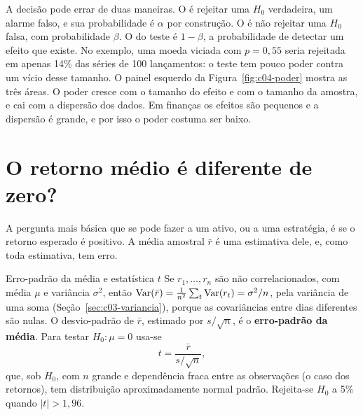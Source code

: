 A decisão pode errar de duas maneiras. O  é rejeitar uma $H_0$ verdadeira, um alarme falso, e sua probabilidade é $\alpha$ por construção. O  é não rejeitar uma $H_0$ falsa, com probabilidade $\beta$. O  do teste é $1 - \beta$, a probabilidade de detectar um efeito que existe. No exemplo, uma moeda viciada com $p = 0,55$ seria rejeitada em apenas 14\% das séries de 100 lançamentos: o teste tem pouco poder contra um vício desse tamanho. O painel esquerdo da Figura~\ref{fig:c04-poder} mostra as três áreas. O poder cresce com o tamanho do efeito e com o tamanho da amostra, e cai com a dispersão dos dados. Em finanças os efeitos são pequenos e a dispersão é grande, e por isso o poder costuma ser baixo.


\section{O retorno médio é diferente de zero?}
\label{sec:c04-media}

A pergunta mais básica que se pode fazer a um ativo, ou a uma estratégia, é se o retorno esperado é positivo. A média amostral $\bar r$ é uma estimativa dele, e, como toda estimativa, tem erro.

\begin{resultado}{Erro-padrão da média e estatística $t$}
Se $r_1, \dots, r_n$ são não correlacionados, com média $\mu$ e variância $\sigma^2$, então $\operatorname{Var}(\bar r) = \frac{1}{n^2}\sum_t \operatorname{Var}(r_t) = \sigma^2/n$, pela variância de uma soma (Seção~\ref{sec:c03-variancia}), porque as covariâncias entre dias diferentes são nulas. O desvio-padrão de $\bar r$, estimado por $s/\sqrt{n}$, é o \textbf{erro-padrão da média}. Para testar $H_0\colon \mu = 0$ usa-se
\begin{equation}
  t = \frac{\bar r}{s/\sqrt{n}} ,
  \label{eq:c04-t-stat}
\end{equation}
que, sob $H_0$, com $n$ grande e dependência fraca entre as observações (o caso dos retornos), tem distribuição aproximadamente normal padrão. Rejeita-se $H_0$ a 5\% quando $|t| > 1,96$.
\end{resultado}

